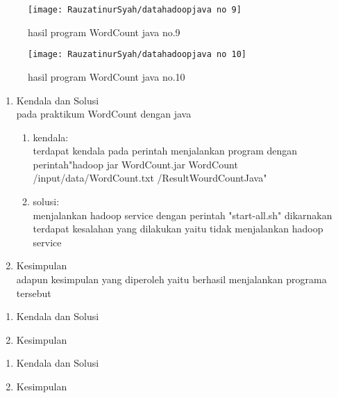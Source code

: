 \begin{figure}[!ht]
\texttt{[image: RauzatinurSyah/datahadoopjava no 9]}
\caption{hasil program WordCount java no.9}
\label{gam:hasil program}
\end{figure}

\begin{figure}[!ht]
\texttt{[image: RauzatinurSyah/datahadoopjava no 10]}
\caption{hasil program WordCount java no.10}
\label{gam:hasil program}
\end{figure}

\begin{enumerate}
\item Kendala dan Solusi \\
pada praktikum WordCount dengan java
\begin{enumerate}
\item kendala: \\
terdapat kendala pada perintah menjalankan program dengan perintah"hadoop jar WordCount.jar WordCount /input/data/WordCount.txt /ResultWourdCountJava"
\item solusi: \\
menjalankan hadoop service dengan perintah "start-all.sh" dikarnakan terdapat kesalahan yang dilakukan yaitu tidak menjalankan hadoop service
\end{enumerate}
\item Kesimpulan\\
adapun kesimpulan yang diperoleh yaitu berhasil menjalankan programa tersebut 
\end{enumerate}

\begin{enumerate}
\item Kendala dan Solusi

\item Kesimpulan

\end{enumerate}

\begin{enumerate}
\item Kendala dan Solusi

\item Kesimpulan

\end{enumerate}
